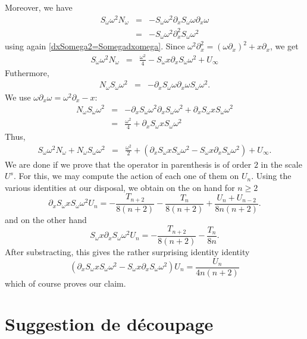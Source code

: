 \documentclass[a4paper]{article}
\begin{document}
Moreover, we have
\begin{eqnarray*}
	S_\omega \omega^2 N_\omega &=& -S_\omega \omega^2 \partial_x S_\omega \omega \partial_x \omega\\
	&=& -S_\omega \omega^2 \partial_x^2 S_\omega \omega^2
\end{eqnarray*}
using again \autoref{dxSomega2=Somegadxomega}. Since $\omega^2 \partial_x ^2 = (\omega \partial_x)^2 + x \partial_x$, we get
\begin{eqnarray*}
	S_\omega \omega^2 N_\omega &=& \frac{\omega^2}{4} - S_\omega x \partial_x S_\omega \omega^2 + U_\infty
\end{eqnarray*}
Futhermore, 
\begin{eqnarray*}
	N_\omega S_\omega \omega^2 &=& -\partial_x S_\omega \omega \partial_x \omega S_\omega \omega^2.
\end{eqnarray*}
We use $\omega \partial_x \omega = \omega^2 \partial_x - x$:
\begin{eqnarray*}
	N_\omega S_\omega \omega^2 &=& -\partial_x S_\omega \omega^2 \partial_x S_\omega \omega^2 + \partial_x S_\omega x S_\omega \omega^2\\
	&=& \frac{\omega^2}{4} + \partial_x S_\omega x S_\omega \omega^2 
\end{eqnarray*}
Thus, 
\begin{eqnarray*}
	S_\omega \omega^2 N_\omega + N_\omega S_\omega \omega^2 &=& \frac{\omega^2}{2} + \left(\partial_x S_\omega xS_\omega \omega^2  - S_\omega x \partial_x  S_\omega \omega^2 \right)+ U_\infty.
\end{eqnarray*}
We are done if we prove that the operator in parenthesis is of order $2$ in the scale $U^s$. For this, we may compute the action of each one of them on $U_n$. Using the various identities at our disposal, we obtain on the on hand for $n\geq 2$ 
\[\partial_x S_\omega x S_\omega \omega^2 U_n = -\frac{T_{n+2}}{8(n+2)} -\frac{T_n}{8(n+2)} +  \frac{U_{n} + U_{n-2}}{8n(n+2)}. \]
and on the other hand
\[S_\omega x \partial_x S_\omega \omega^2 U_n = -\frac{T_{n+2}}{8(n+2)} - \frac{T_n}{8n}.\]
After substracting, this gives the rather surprising identity identity
\[\left(\partial_x S_\omega xS_\omega \omega^2  - S_\omega x \partial_x  S_\omega \omega^2 \right)U_n = \frac{U_n}{4n(n+2)}\]
which of course proves our claim.

\section{Suggestion de découpage}
\end{document}
